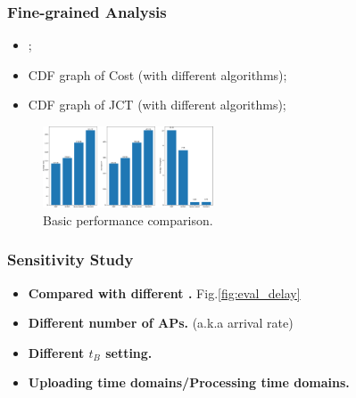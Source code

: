     \subsubsection{Fine-grained Analysis}
    \begin{itemize}
        \item {};
        \item CDF graph of Cost (with different algorithms);
        \item CDF graph of JCT (with different algorithms);
    \end{itemize}

    \begin{figure}[h]
        \centering
        \includegraphics[width=0.45\textwidth]{images/bar_graph.pdf}
        \caption{Basic performance comparison.}
        \label{fig:bar_plot}
    \end{figure}

    \subsubsection{Sensitivity Study}
    \begin{itemize}
        \item \textbf{Compared with different \brlatency.} Fig.\ref{fig:eval_delay}
        \item \textbf{Different number of APs.} (a.k.a arrival rate)
        \item \textbf{Different $t_B$ setting.}
        \item \textbf{Uploading time domains/Processing time domains.}
    \end{itemize}

